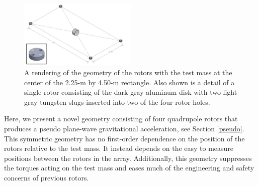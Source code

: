\documentclass[superscriptaddress, twocolumn, prd]{revtex4-1}
\begin{document}
\begin{figure}[!h]
\centering \includegraphics[width=0.5\textwidth]{Super4_Model.pdf}
\caption{A rendering of the geometry of the rotors with the test mass at the center of the 2.25-m by 4.50-m rectangle. Also shown is a detail of a single rotor consisting of the dark gray aluminum disk with two light gray tungsten slugs inserted into two of the four rotor holes.}
\label{cad} 
\end{figure}

Here, we present a novel geometry consisting of four quadrupole rotors that produces a pseudo plane-wave gravitational acceleration, see Section \ref{pseudo}. This symmetric geometry has no first-order dependence on the position of the rotors relative to the test mass. It instead depends on the easy to measure positions between the rotors in the array. Additionally, this geometry suppresses the torques acting on the test mass and eases much of the engineering and safety concerns of previous rotors.

%
%
%
\end{document}
